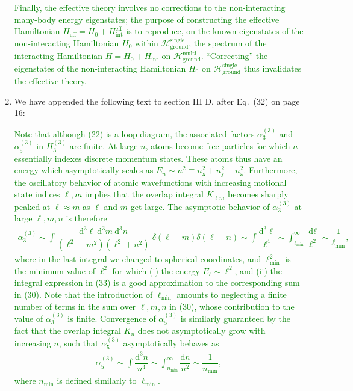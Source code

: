 \documentclass[preprint]{revtex4-1}
\renewcommand{\t}{\text} %
\newcommand{\f}{\dfrac} %
\newcommand{\p}[1]{\left(#1\right)} %
\renewcommand{\d}{\text{d}}
\newcommand{\x}{\text{x}}
\newcommand{\y}{\text{y}}
\newcommand{\z}{\text{z}}
\renewcommand{\H}{\mathcal{H}}
\newcommand{\1}{\mathds{1}}
\newcommand{\green}[1]{\textcolor{green}{#1}}
\newcounter{point}
\newcommand{\step}{\stepcounter{point}\setcounter{enumi}{0}}
\begin{document}
\begin{enumerate}[label=(R1.\arabic{point}.\arabic*)]
  \green{Finally, the effective theory involves no corrections to the
    non-interacting many-body energy eigenstates; the purpose of
    constructing the effective Hamiltonian
    $H_{\t{eff}} = H_0 + H_{\t{int}}^{\t{eff}}$ is to reproduce, on
    the known eigenstates of the non-interacting Hamiltonian $H_0$
    within $\H_{\t{ground}}^{\t{single}}$, the spectrum of the
    interacting Hamiltonian $H = H_0 + H_{\t{int}}$ on
    $\H_{\t{ground}}^{\t{multi}}$.  ``Correcting'' the eigenstates of
    the non-interacting Hamiltonian $H_0$ on
    $\H_{\t{ground}}^{\t{single}}$ thus invalidates the effective
    theory.}


  \step
  \step
\item We have appended the following text to section III D, after
  Eq.~(32) on page 16:

  \green{Note that although (22) is a loop diagram, the associated
    factors $\alpha_3^{(3)}$ and $\alpha_5^{(3)}$ in $H_3^{(3)}$ are
    finite.  At large $n$, atoms become free particles for which $n$
    essentially indexes discrete momentum states.  These atoms thus
    have an energy which asymptotically scales as
    $E_n\sim n^2\equiv n_\x^2+n_\y^2+n_\z^2$.  Furthermore, the
    oscillatory behavior of atomic wavefunctions with increasing
    motional state indices $\ell,m$ implies that the overlap integral
    $K_{\ell m}$ becomes sharply peaked at $\ell\approx m$ as $\ell$
    and $m$ get large.  The asymptotic behavior of $\alpha_3^{(3)}$ at
    large $\ell,m,n$ is therefore
    \begin{align*}
      \alpha_3^{(3)}
      \sim \int \f{\d^3\ell~\d^3m~\d^3n}{\p{\ell^2+m^2}\p{\ell^2+n^2}}
      ~\delta\p{\ell-m}\delta\p{\ell-n}
      \sim \int \f{\d^3\ell}{\ell^4}
      \sim \int_{\ell_{\t{min}}}^\infty \f{\d\ell}{\ell^2}
      \sim \f1{\ell_{\t{min}}},
      \tag{33}
    \end{align*}
    where in the last integral we changed to spherical coordinates,
    and $\ell_{\t{min}}^2$ is the minimum value of $\ell^2$ for which
    (i) the energy $E_\ell\sim\ell^2$, and (ii) the integral
    expression in (33) is a good approximation to the corresponding
    sum in (30).  Note that the introduction of $\ell_{\t{min}}$
    amounts to neglecting a finite number of terms in the sum over
    $\ell,m,n$ in (30), whose contribution to the value of
    $\alpha_3^{(3)}$ is finite.  Convergence of $\alpha_5^{(3)}$ is
    similarly guaranteed by the fact that the overlap integral $K_n$
    does not asymptotically grow with increasing $n$, such that
    $\alpha_5^{(3)}$ asymptotically behaves as
    \begin{align*}
      \alpha_5^{(3)} \sim \int \f{\d^3 n}{n^4}
      \sim \int_{n_{\t{min}}}^\infty \f{\d n}{n^2}
      \sim \f1{n_{\t{min}}},
      \tag{34}
    \end{align*}
    where $n_{\t{min}}$ is defined similarly to $\ell_{\t{min}}$.}



\end{enumerate}
\end{document}
